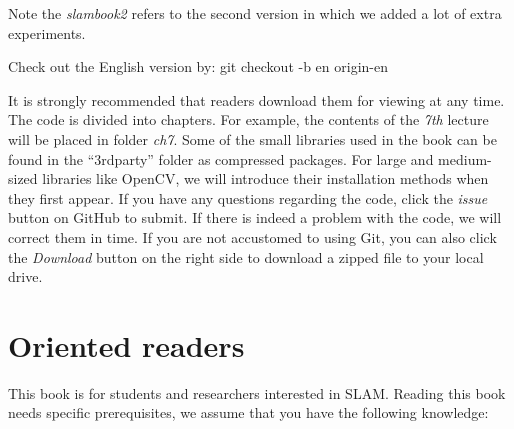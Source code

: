 Note the \textit{slambook2} refers to the second version in which we added a lot of extra experiments.

Check out the English version by:
{\hfill git checkout -b en origin-en\hfill}

It is strongly recommended that readers download them for viewing at any time. The code is divided into chapters. For example, the contents of the \textit{7th} lecture will be placed in folder \textit{ch7}. Some of the small libraries used in the book can be found in the ``3rdparty'' folder as compressed packages. For large and medium-sized libraries like OpenCV, we will introduce their installation methods when they first appear. If you have any questions regarding the code, click the \textit{issue} button on GitHub to submit. If there is indeed a problem with the code, we will correct them in time. If you are not accustomed to using Git, you can also click the  \textit{Download} button on the right side to download a zipped file to your local drive.

\section{Oriented readers}

This book is for students and researchers interested in SLAM. Reading this book needs specific prerequisites, we assume that you have the following knowledge:

